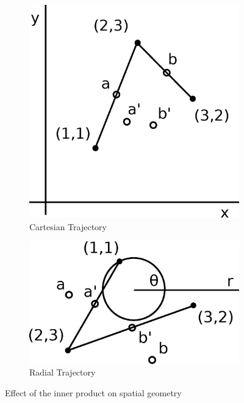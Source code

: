 \begin{figure}
  \centering
  \begin{subfigure}{0.45\linewidth}
    \def\svgwidth{\linewidth}
    \includegraphics[width=\linewidth]{fig/interpolation-cartesian.eps}
    \caption{Cartesian Trajectory}
  \end{subfigure}
  \begin{subfigure}{0.45\linewidth}
    \def\svgwidth{\linewidth}
    \includegraphics[width=\linewidth]{fig/interpolation-radial.eps}
    \caption{Radial Trajectory}
  \end{subfigure}
  \caption{Effect of the inner product on spatial geometry}
  \label{figure:cartesian-radial}
\end{figure}


